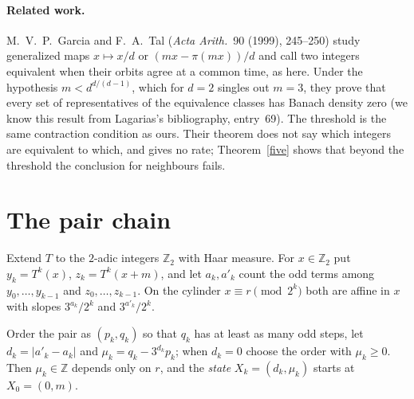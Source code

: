 \documentclass[11pt]{article}
\theoremstyle{remark}
\newcommand{\Z}{\mathbb{Z}}
\begin{document}
\paragraph{Related work.} M.~V.~P.~Garcia and F.~A.~Tal (\emph{Acta Arith.}\ 90 (1999), 245--250)
study generalized maps $x\mapsto x/d$ or $(mx-\pi(mx))/d$ and call two integers equivalent when
their orbits agree at a common time, as here. Under the hypothesis $m<d^{d/(d-1)}$, which for
$d=2$ singles out $m=3$, they prove that every set of representatives of the equivalence classes
has Banach density zero (we know this result from Lagarias's bibliography, entry~69). The threshold
is the same contraction condition as ours. Their theorem does not say which integers are
equivalent to which, and gives no rate; Theorem~\ref{five} shows that beyond the threshold the
conclusion for neighbours fails.

\section{The pair chain}
Extend $T$ to the $2$-adic integers $\Z_2$ with Haar measure. For $x\in\Z_2$ put
$y_k=T^k(x)$, $z_k=T^k(x+m)$, and let $a_k,a'_k$ count the odd terms among $y_0,\dots,y_{k-1}$ and
$z_0,\dots,z_{k-1}$. On the cylinder $x\equiv r \pmod{2^k}$ both are affine in $x$ with slopes
$3^{a_k}/2^k$ and $3^{a'_k}/2^k$.

Order the pair as $(p_k,q_k)$ so that $q_k$ has at least as many odd steps, let $d_k=|a'_k-a_k|$
and $\mu_k=q_k-3^{d_k}p_k$; when $d_k=0$ choose the order with $\mu_k\ge0$. Then $\mu_k\in\Z$
depends only on $r$, and the \emph{state} $X_k=(d_k,\mu_k)$ starts at $X_0=(0,m)$.
\end{document}
